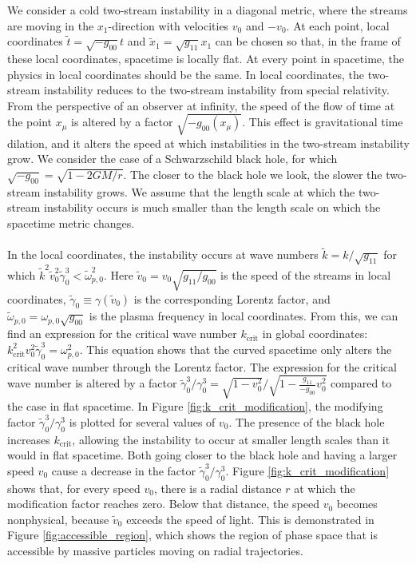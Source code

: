 \documentclass{article}
\begin{document}
We consider a cold two-stream instability in a diagonal metric, where the streams are moving in the $x_1$-direction with velocities $v_0$ and $-v_0$. At each point, local coordinates $\tilde{t} = \sqrt{-g_{00}} t$ and $\tilde{x}_1 = \sqrt{g_{11}} x_1$ can be chosen so that, in the frame of these local coordinates, spacetime is locally flat. At every point in spacetime, the physics in local coordinates should be the same. In local coordinates, the two-stream instability reduces to the two-stream instability from special relativity. From the perspective of an observer at infinity, the speed of the flow of time at the point $x_\mu$ is altered by a factor $\sqrt{-g_{00}(x_\mu)}$. This effect is gravitational time dilation, and it alters the speed at which instabilities in the two-stream instability grow. We consider the case of a Schwarzschild black hole, for which $\sqrt{-g_{00}} = \sqrt{1 - 2GM/r}$. The closer to the black hole we look, the slower the two-stream instability grows. We assume that the length scale at which the two-stream instability occurs is much smaller than the length scale on which the spacetime metric changes.\\
\\
In the local coordinates, the instability occurs at wave numbers $\tilde{k} = k / \sqrt{g_{11}}$ for which $\tilde{k}^2\tilde{v}_0^2\tilde\gamma_0^3 < \tilde\omega_{p,0}^2$. Here $\tilde{v}_0 = v_0 \sqrt{g_{11}/g_{00}}$ is the speed of the streams in local coordinates, $\tilde\gamma_0 \equiv \gamma(\tilde{v}_0)$ is the corresponding Lorentz factor, and $\tilde\omega_{p,0} = \omega_{p,0}\sqrt{g_{00}}$ is the plasma frequency in local coordinates. From this, we can find an expression for the critical wave number $k_\text{crit}$ in global coordinates: $k^2_\text{crit} v_0^2 \tilde{\gamma}_0^3 = \omega_{p,0}^2$. This equation shows that the curved spacetime only alters the critical wave number through the Lorentz factor. The expression for the critical wave number is altered by a factor $\tilde{\gamma}_0^3 / \gamma_0^3 = \sqrt{1 - v_0^2} / \sqrt{1 - \frac{g_{11}}{-g_{00}} v_0^2}$ compared to the case in flat spacetime. In Figure \ref{fig:k_crit_modification}, the modifying factor $\tilde{\gamma}_0^3 / \gamma_0^3$ is plotted for several values of $v_0$. The presence of the black hole increases $k_\text{crit}$, allowing the instability to occur at smaller length scales than it would in flat spacetime. Both going closer to the black hole and having a larger speed $v_0$ cause a decrease in the factor $\tilde{\gamma}_0^3 / \gamma_0^3$. Figure \ref{fig:k_crit_modification} shows that, for every speed $v_0$, there is a radial distance $r$ at which the modification factor reaches zero. Below that distance, the speed $v_0$ becomes nonphysical, because $\tilde{v}_0$ exceeds the speed of light. This is demonstrated in Figure \ref{fig:accessible_region}, which shows the region of phase space that is accessible by massive particles moving on radial trajectories.\\
\end{document}
